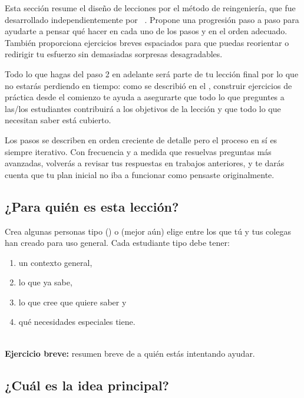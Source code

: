 
Esta sección resume el diseño de lecciones por el método de reingeniería,
que fue desarrollado independientemente por ~\cite{Wigg2005,Bigg2011,Fink2013}.
Propone una progresión paso a paso
para ayudarte a pensar qué hacer en cada uno de los pasos y en el orden adecuado.
También proporciona ejercicios breves espaciados
para que puedas reorientar o redirigir tu esfuerzo sin demasiadas sorpresas desagradables.

Todo lo que hagas del paso 2 en adelante será parte de tu lección final
por lo que no estarás perdiendo en tiempo:
como se describió en el ,
construir ejercicios de práctica desde el comienzo te ayuda a asegurarte que
todo lo que preguntes a las/los estudiantes contribuirá a los objetivos de la lección
y que todo lo que necesitan saber está cubierto.

Los pasos se describen en orden creciente de detalle
pero el proceso en sí es siempre iterativo.
Con frecuencia y a medida que resuelvas preguntas más avanzadas, volverás a revisar tus respuestas en trabajos anteriores, 
y te darás cuenta que tu plan inicial no iba a funcionar como pensaste originalmente.

\subsection*{¿Para quién es esta lección?}

Crea algunas personas tipo ()
o (mejor aún) elige entre los que tú y tus colegas han creado para uso general.
Cada estudiante tipo debe tener:

\begin{enumerate}

\item
  un contexto general,

\item
  lo que ya sabe,

\item
  lo que cree que quiere saber y

\item
  qué necesidades especiales tiene.

\end{enumerate}

~\\
\noindent
\textbf{Ejercicio breve:} resumen breve de a quién estás intentando ayudar.

\subsection*{¿Cuál es la idea principal?}


